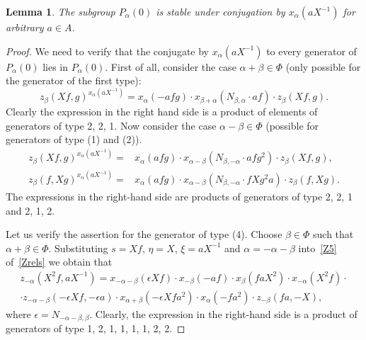 \documentclass[oneside, 8pt]{amsart}
\newtheorem{lemma}{Lemma}
\theoremstyle{remark}
\theoremstyle{definition}
\numberwithin{equation}{section}
\begin{document}
\begin{lemma}\label{P0_conj} The subgroup $P_\alpha(0)$ is stable under conjugation by $x_\alpha(aX^{-1})$ for arbitrary $a\in A$. \end{lemma}
\begin{proof} We need to verify that the conjugate by $x_\alpha(aX^{-1})$ to every generator of $P_\alpha(0)$ lies in $P_\alpha(0)$. First of all, consider the case $\alpha + \beta \in \Phi$ (only possible for the generator of the first type):
\[ z_{\beta}(Xf, g) ^ {x_{\alpha}(aX^{-1})} = x_{\alpha} (- afg) \cdot x_{\beta+\alpha} (N_{\beta, \alpha}\cdot af)     \cdot z_{\beta}(Xf, g). \]
Clearly the expression in the right hand side is a product of elements of generators of type 2, 2, 1. 
Now consider the case $\alpha - \beta \in \Phi$ (possible for generators of type (1) and (2)).
\begin{align} z_{\beta}(Xf, g) ^ {x_{\alpha}(aX^{-1})} = &  x_{\alpha} (afg) \cdot x_{\alpha-\beta} (N_{\beta,-\alpha}\cdot afg^2) \cdot z_{\beta}(Xf, g), \\
z_{\beta}(f, Xg) ^ {x_{\alpha}(aX^{-1})} = & x_{\alpha} (afg) \cdot x_{\alpha-\beta} (N_{\beta,-\alpha}\cdot fXg^2a) \cdot z_{\beta}(f, Xg). \end{align}
The expressions in the right-hand side are products of generators of type 2, 2, 1 and 2, 1, 2.

Let us verify the assertion for the generator of type (4). Choose $\beta\in \Phi$ such that $\alpha+\beta \in \Phi$. Substituting $s = Xf$, $\eta = X$, $\xi = aX^{-1}$ and $\alpha = -\alpha - \beta$ into~\eqref{Z5} of~\cref{Zrels} we obtain that
\begin{multline} \nonumber
 z_{-\alpha}(X^2f, aX^{-1}) = x_{-\alpha-\beta}(\epsilon Xf) \cdot x_{-\beta}(-af) \cdot x_{\beta}(f a X^2) \cdot x_{-\alpha}(X^2f) \cdot \\ \cdot z_{-\alpha-\beta}(-\epsilon Xf, -\epsilon a) \cdot x_{\alpha+\beta}(-\epsilon Xf a^2) \cdot x_{\alpha}(- f a^2) \cdot z_{-\beta}(f a, -X),
\end{multline}
where $\epsilon = N_{-\alpha-\beta,\beta}$. Clearly, the expression in the right-hand side is a product of generators of type 1, 2, 1, 1, 1, 1, 2, 2.


\end{proof}
\end{document}
